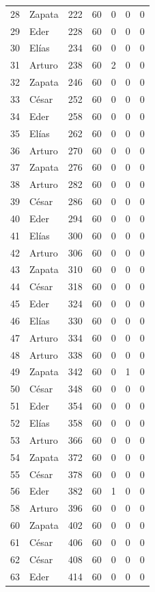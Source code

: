 \begin{longtable}{llrrrrr}
28 & Zapata & 222 & 60 & 0 & 0 & 0 \\
29 & Eder & 228 & 60 & 0 & 0 & 0 \\
30 & Elías & 234 & 60 & 0 & 0 & 0 \\
31 & Arturo & 238 & 60 & 2 & 0 & 0 \\
32 & Zapata & 246 & 60 & 0 & 0 & 0 \\
33 & César & 252 & 60 & 0 & 0 & 0 \\
34 & Eder & 258 & 60 & 0 & 0 & 0 \\
35 & Elías & 262 & 60 & 0 & 0 & 0 \\
36 & Arturo & 270 & 60 & 0 & 0 & 0 \\
37 & Zapata & 276 & 60 & 0 & 0 & 0 \\
38 & Arturo & 282 & 60 & 0 & 0 & 0 \\
39 & César & 286 & 60 & 0 & 0 & 0 \\
40 & Eder & 294 & 60 & 0 & 0 & 0 \\
41 & Elías & 300 & 60 & 0 & 0 & 0 \\
42 & Arturo & 306 & 60 & 0 & 0 & 0 \\
43 & Zapata & 310 & 60 & 0 & 0 & 0 \\
44 & César & 318 & 60 & 0 & 0 & 0 \\
45 & Eder & 324 & 60 & 0 & 0 & 0 \\
46 & Elías & 330 & 60 & 0 & 0 & 0 \\
47 & Arturo & 334 & 60 & 0 & 0 & 0 \\
48 & Arturo & 338 & 60 & 0 & 0 & 0 \\
49 & Zapata & 342 & 60 & 0 & 1 & 0 \\
50 & César & 348 & 60 & 0 & 0 & 0 \\
51 & Eder & 354 & 60 & 0 & 0 & 0 \\
52 & Elías & 358 & 60 & 0 & 0 & 0 \\
53 & Arturo & 366 & 60 & 0 & 0 & 0 \\
54 & Zapata & 372 & 60 & 0 & 0 & 0 \\
55 & César & 378 & 60 & 0 & 0 & 0 \\
56 & Eder & 382 & 60 & 1 & 0 & 0 \\
58 & Arturo & 396 & 60 & 0 & 0 & 0 \\
60 & Zapata & 402 & 60 & 0 & 0 & 0 \\
61 & César & 406 & 60 & 0 & 0 & 0 \\
62 & César & 408 & 60 & 0 & 0 & 0 \\
63 & Eder & 414 & 60 & 0 & 0 & 0 \\

\end{longtable}
